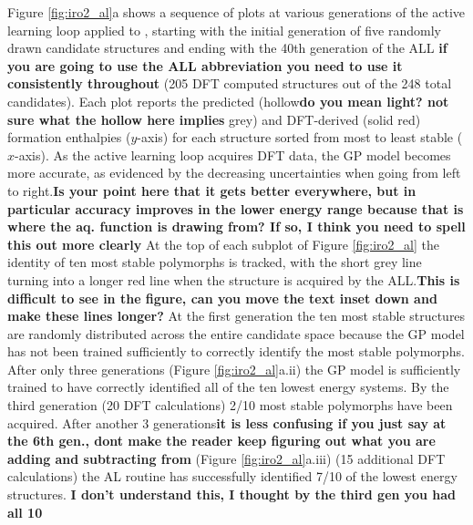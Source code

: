 %
Figure \ref{fig:iro2_al}a shows a sequence of plots at various generations of the active learning loop applied to \IrOthree,
starting with the initial generation of five randomly drawn candidate structures and ending with the 40th generation of the ALL \textbf{if you are going to use the ALL abbreviation you need to use it consistently throughout}
(\num{205} DFT computed structures out of the \num{248} total candidates).
%
Each plot reports the predicted (hollow\textbf{do you mean light? not sure what the hollow here implies} grey) and DFT-derived (solid red) formation enthalpies ($y$-axis) for each structure sorted from most to least stable ($x$-axis).
%
As the active learning loop acquires DFT data, the GP model becomes more accurate, as evidenced by the decreasing uncertainties when going from left to right.\textbf{Is your point here that it gets better everywhere, but in particular accuracy improves in the lower energy range because that is where the aq. function is drawing from?  If so, I think you need to spell this out more clearly}
%
At the top of each subplot of Figure \ref{fig:iro2_al} the identity of ten most stable polymorphs is tracked,
with the short grey line turning into a longer red line when the structure is acquired by the ALL.\textbf{This is difficult to see in the figure, can you move the text inset down and make these lines longer?}
%
At the first generation the ten most stable structures are randomly distributed across the entire candidate space because the GP model has not been trained sufficiently to correctly identify the most stable polymorphs.
%
After only three generations (Figure \ref{fig:iro2_al}a.ii) the GP model is sufficiently trained to have correctly identified all of the ten lowest energy systems.
%
By the third generation (\num{20} DFT calculations) \num{2/10} most stable polymorphs have been acquired.
%
After another \num{3} generations\textbf{it is less confusing if you just say at the 6th gen., dont make the reader keep figuring out what you are adding and subtracting from} (Figure \ref{fig:iro2_al}a.iii) (\num{15} additional DFT calculations) the AL routine has successfully identified \num{7/10} of the lowest energy structures. \textbf{I don't understand this, I thought by the third gen you had all 10}
